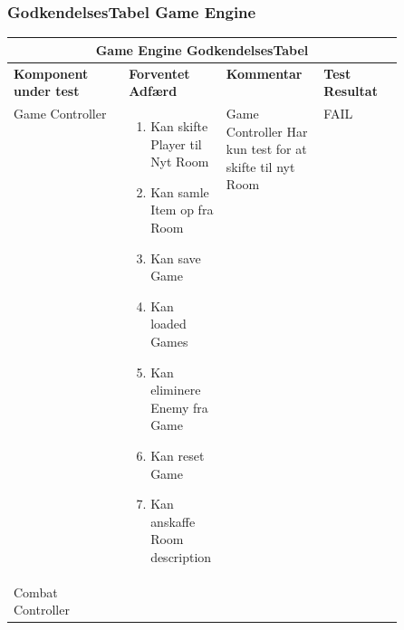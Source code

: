 \subsubsection{GodkendelsesTabel Game Engine}
\vspace{-1em}
\begin{center}
\begin{longtable}{|l|p{0.25\linewidth}|p{0.25\linewidth}|l|}
  \hline
  \multicolumn{4}{|c|}{\textbf{Game Engine GodkendelsesTabel}} \\ \hline
  \textbf{Komponent under test} & \textbf{Forventet Adfærd} & \textbf{Kommentar} & \textbf{Test Resultat} \\ \hline
  Game Controller
  &
    \begin{enumerate}
      \item \begin{flushleft} Kan skifte Player til Nyt Room \end{flushleft}
      \item \begin{flushleft} Kan samle Item op fra Room  \end{flushleft}
      \item \begin{flushleft} Kan save Game \end{flushleft}
      \item \begin{flushleft} Kan loaded Games \end{flushleft}
      \item \begin{flushleft} Kan eliminere Enemy fra Game \end{flushleft}
      \item \begin{flushleft} Kan reset Game \end{flushleft}
      \item \begin{flushleft} Kan anskaffe Room description \end{flushleft}
    \end{enumerate}
  &
  \flushleft 
  Game Controller Har kun test for at skifte til nyt Room
  &
  FAIL
  \\ \hline
  Combat Controller
  &
  \begin{enumerate}

\end{enumerate}
\end{longtable}
\end{center}
